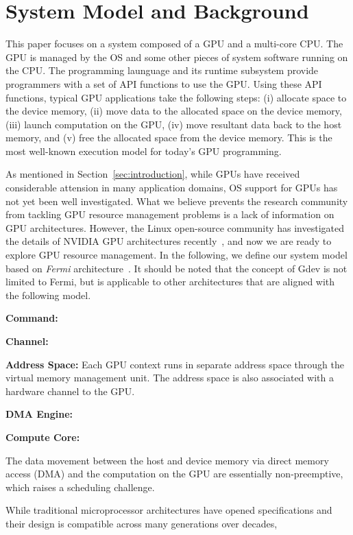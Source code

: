\section{System Model and Background}
\label{sec:model}

This paper focuses on a system composed of a GPU and a multi-core CPU.
The GPU is managed by the OS and some other pieces of system software
running on the CPU.
The programming launguage and its runtime subsystem provide programmers
with a set of API functions to use the GPU.
Using these API functions, typical GPU applications take the following
steps: (i) allocate space to the device memory, (ii) move data to the
allocated space on the device memory, (iii) launch computation on the
GPU, (iv) move resultant data back to the host memory, and (v) free the
allocated space from the device memory.
This is the most well-known execution model for today's GPU
programming.

As mentioned in Section~\ref{sec:introduction}, while GPUs have received
considerable attension in many application domains, OS support for GPUs
has not yet been well investigated.
What we believe prevents the research community from tackling GPU
resource management problems is a lack of information on GPU
architectures.
However, the Linux open-source community has investigated the details
of NVIDIA GPU architectures recently~\cite{envytools}, and now we are
ready to explore GPU resource management.
In the following, we define our system model based on \textit{Fermi}
architecture~\cite{Fermi}.
It should be noted that the concept of Gdev is not limited to Fermi, but
is applicable to other architectures that are aligned with the following
model.

\textbf{Command:}


\textbf{Channel:}


\textbf{Address Space:}
Each GPU context runs in separate address space through the virtual
memory management unit.
The address space is also associated with a hardware channel to the GPU.

\textbf{DMA Engine:}

\textbf{Compute Core:}

The data movement between the host and device memory via direct memory
access (DMA) and the computation on the GPU are essentially
non-preemptive, which raises a scheduling challenge.

While traditional microprocessor architectures have opened
specifications and their design is compatible across many generations
over decades, 


